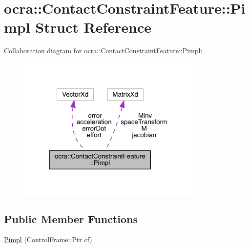 \hypertarget{structocra_1_1ContactConstraintFeature_1_1Pimpl}{}\section{ocra\+:\+:Contact\+Constraint\+Feature\+:\+:Pimpl Struct Reference}
\label{structocra_1_1ContactConstraintFeature_1_1Pimpl}


Collaboration diagram for ocra\+:\+:Contact\+Constraint\+Feature\+:\+:Pimpl\+:\nopagebreak
\begin{figure}[H]
\begin{center}
\leavevmode
\includegraphics[width=262pt]{d7/d6e/structocra_1_1ContactConstraintFeature_1_1Pimpl__coll__graph}
\end{center}
\end{figure}
\subsection*{Public Member Functions}
\begin{DoxyCompactItemize}
\item 
\hyperlink{structocra_1_1ContactConstraintFeature_1_1Pimpl_a59ec46b69968b06c7e858234acccd990}{Pimpl} (Control\+Frame\+::\+Ptr cf)
\end{DoxyCompactItemize}
